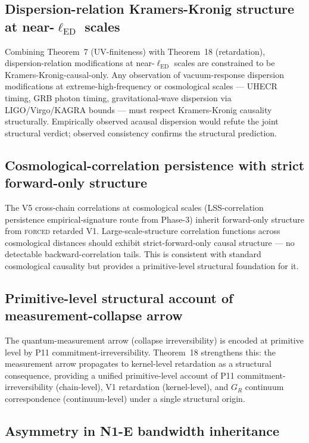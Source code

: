 \documentclass[11pt,a4paper]{article}
\begin{document}
\subsection{Dispersion-relation Kramers-Kronig structure at near-$\ell_\mathrm{ED}$ scales}

Combining Theorem~7 (UV-finiteness) with Theorem~18 (retardation), dispersion-relation modifications at near-$\ell_\mathrm{ED}$ scales are constrained to be Kramers-Kronig-causal-only. Any observation of vacuum-response dispersion modifications at extreme-high-frequency or cosmological scales --- UHECR timing, GRB photon timing, gravitational-wave dispersion via LIGO/Virgo/KAGRA bounds --- must respect Kramers-Kronig causality structurally. Empirically observed acausal dispersion would refute the joint structural verdict; observed consistency confirms the structural prediction.

\subsection{Cosmological-correlation persistence with strict forward-only structure}

The V5 cross-chain correlations at cosmological scales (LSS-correlation persistence empirical-signature route from Phase-3) inherit forward-only structure from \textsc{forced} retarded V1. Large-scale-structure correlation functions across cosmological distances should exhibit strict-forward-only causal structure --- no detectable backward-correlation tails. This is consistent with standard cosmological causality but provides a primitive-level structural foundation for it.

\subsection{Primitive-level structural account of measurement-collapse arrow}

The quantum-measurement arrow (collapse irreversibility) is encoded at primitive level by P11 commitment-irreversibility. Theorem~18 strengthens this: the measurement arrow propagates to kernel-level retardation as a structural consequence, providing a unified primitive-level account of P11 commitment-irreversibility (chain-level), V1 retardation (kernel-level), and $G_R$ continuum correspondence (continuum-level) under a single structural origin.

\subsection{Asymmetry in N1-E bandwidth inheritance}
\end{document}

